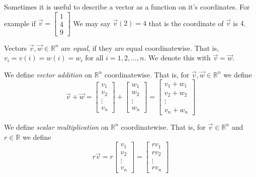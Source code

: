 \begin{remark}
Sometimes it is useful to describe a vector as a function on it's coordinates. 
For example if 
$\vec{v}=\begin{bmatrix}1 \\ 4 \\ 9 \end{bmatrix}$ We may say 
$\vec{v}(2)=4$ that is the  coordinate of $\vec{v}$ is $4$.
\end{remark}


\begin{definition}
Vectors $\vec{v}, \vec{w} \in \mathbb{R}^n$ are \emph{equal},  if they are equal 
coordinatewise. That is, $v_i=v(i)=w(i)=w_i$ for all $i=1,2,\ldots, n$. We 
denote this with  $\vec{v}=\vec{w}$.
\end{definition}


\begin{definition}
We define \emph{vector addition} on $\mathbb{R}^n$ coordinatewise. 
That is, for $\vec{v},\vec{w} \in \mathbb{R}^n$ we define
\[
\vec{v}+\vec{w}=
\begin{bmatrix}v_1\\ v_2 \\ \vdots \\ v_n\end{bmatrix}+
\begin{bmatrix}w_1\\ w_2 \\ \vdots \\ w_n\end{bmatrix}=
\begin{bmatrix}v_1+w_1\\ v_2+w_2 \\ \vdots \\ v_n+w_n\end{bmatrix}
\]
\end{definition}

\begin{definition}
We define \emph{scalar multiplication} on $\mathbb{R}^n$ coordinatewise. That 
is, for $\vec{v} \in \mathbb{R}^n$ and $r \in \mathbb{R}$ we define
\[
r\vec{v}=
r\begin{bmatrix}v_1\\ v_2 \\ \vdots \\ v_n\end{bmatrix}=
\begin{bmatrix}rv_1\\ rv_2 \\ \vdots \\ rv_n\end{bmatrix}
\]
\end{definition}

